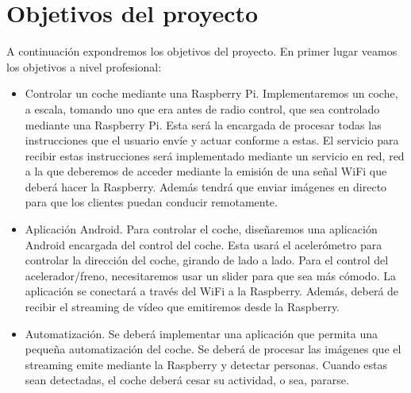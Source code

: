 \documentclass{pclass}
\begin{document}
\section{Objetivos del proyecto}

A continuación expondremos los objetivos del proyecto. En primer lugar veamos los objetivos a nivel profesional:
\begin{itemize}
	\item Controlar un coche mediante una Raspberry Pi. Implementaremos un coche, a escala, tomando uno que era antes de radio control, que sea controlado mediante una Raspberry Pi. Esta será la encargada de procesar todas las instrucciones que el usuario envíe y actuar conforme a estas. El servicio para recibir estas instrucciones será implementado mediante un servicio en red, red a la que deberemos de acceder mediante la emisión de una señal WiFi que deberá hacer la Raspberry. Además tendrá que enviar imágenes en directo para que los clientes puedan conducir remotamente.
	
	\item Aplicación Android. Para controlar el coche, diseñaremos una aplicación Android encargada del control del coche. Esta usará el acelerómetro para controlar la dirección del coche, girando de lado a lado. Para el control del acelerador/freno, necesitaremos usar un slider para que sea más cómodo. La aplicación se conectará a través del WiFi a la Raspberry. Además, deberá de recibir el streaming de vídeo que emitiremos desde la Raspberry.
	
	\item Automatización. Se deberá implementar una aplicación que permita una pequeña automatización del coche. Se deberá de procesar las imágenes que el streaming emite mediante la Raspberry y detectar personas. Cuando estas sean detectadas, el coche deberá cesar su actividad, o sea, pararse.
\end{itemize}
\end{document}
